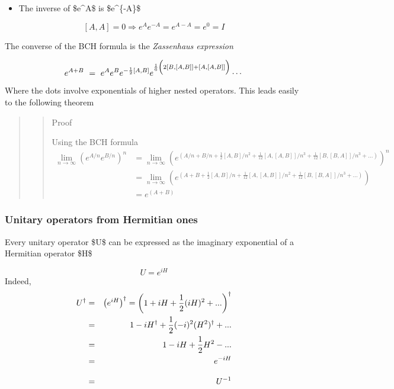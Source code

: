 \documentclass[11pt]{article}
\providecommand{\tightlist}{%
      \setlength{\itemsep}{0pt}\setlength{\parskip}{0pt}}
\begin{document}
    \begin{itemize}
\tightlist
\item
  The inverse of \$e\^{}A\$ is \$e\^{}\{-A\}\$
\end{itemize}

\[[A,A]=0 \Rightarrow e^A e^{-A} = e^{A-A} = e^0 = I\]

    The converse of the BCH formula is the \emph{Zassenhaus expression}

\[
e^{A+B} ~=~ e^{A} e^{B} e^{-\frac{1}{2}[A,B]} e^{\frac{1}{6} \left( \rule{0mm}{3mm}2[B,[A,B]]+[A,[A,B]]\right)} \cdots
\]

Where the dots involve exponentials of higher nested operators. This
leads easily to the following theorem

    \begin{quote}
\begin{quote}
Proof

Using the BCH formula \begin{align}
\lim_{n\to\infty}\left(e^{A/n} e^{B/n}\right)^n &= \lim_{n\to\infty}\left( e^{\left({A/n+B/n + \frac{1}{2}[A,B]/n^2 + \frac{1}{12}[A,[A,B]]/n^3+ \frac{1}{12}[B,[B,A]]/n^3 + ...}\right)}\right)^n  \\ 
&= \lim_{n\to\infty}\left( e^{\left({A+B + \frac{1}{2}[A,B]/n + \frac{1}{12}[A,[A,B]]/n^2+ \frac{1}{12}[B,[B,A]]/n^3 + ...}\right)}\right) \\
&= e^{(A+B)}
\end{align}
\end{quote}
\end{quote}

    \subsubsection{Unitary operators from Hermitian
ones}\label{unitary-operators-from-hermitian-ones}

Every unitary operator \$U\$ can be expressed as the imaginary
exponential of a Hermitian operator \$H\$

\[
U = e^{i H}
\] Indeed, \begin{eqnarray}
U^\dagger &=& \left( e^{iH}\right)^\dagger = \left( 1+ iH + \frac{1}{2}(i H)^2 + ...\right)^\dagger \\
&=& 1 - iH^\dagger  + \frac{1}{2}(-i)^2 (H^2)^\dagger + ... \\
&=& 1 - iH +\frac{1}{2} H^2 - ... \\
&=& e^{-iH}\\ \rule{0mm}{6mm}
&=& U^{-1}
\end{eqnarray}
\end{document}
